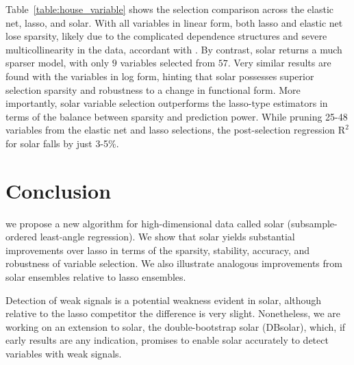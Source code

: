 \documentclass[11pt,review,authoryear]{elsarticle}
\begin{document}
Table~\ref{table:house_variable} shows the selection comparison across the elastic net, lasso, and solar. With all variables in linear form, both lasso and elastic net lose sparsity, likely due to the complicated dependence structures and severe multicollinearity in the data, accordant with \citet{jia2010model}. By contrast, solar returns a much sparser model, with only $9$ variables selected from $57$. Very similar results are found with the variables in log form, hinting that solar possesses superior selection sparsity and robustness to a change in functional form. More importantly, solar variable selection outperforms the lasso-type estimators in terms of the balance between sparsity and prediction power. While pruning 25-48 variables from the elastic net and lasso selections, the post-selection regression $\mathrm{R}^2$ for solar falls by just 3-5\%.


\section{Conclusion}

 we propose a new algorithm for high-dimensional data called solar (subsample-ordered least-angle regression). We show that solar yields substantial improvements over lasso in terms of the sparsity, stability, accuracy, and robustness of variable selection. We also illustrate analogous improvements from solar ensembles relative to lasso ensembles.

Detection of weak signals is a potential weakness evident in solar, although relative to the lasso competitor the difference is very slight. Nonetheless, we are working on an extension to solar, the double-bootstrap solar (DBsolar), which, if early results are any indication, promises to enable solar accurately to detect variables with weak signals.



%


\end{document}
